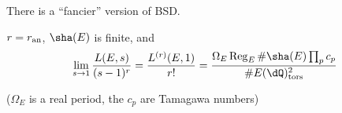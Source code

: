 \documentclass{article}
\begin{document}
There is a ``fancier'' version of BSD. 

\begin{conjecture}[BSD]
$r=r_\textnormal{an}$, $\sha(E)$ is finite, and 
\[
  \lim_{s\to 1} \frac{L(E,s)}{(s-1)^r} = \frac{L^{(r)}(E,1)}{r!} = \frac{\Omega_E \operatorname{Reg}_E \# \sha(E) \prod_p c_p}{\# E(\dQ)_\textnormal{tors}^2}
\]
\end{conjecture}

($\Omega_E$ is a real period, the $c_p$ are Tamagawa numbers)








\end{document}
